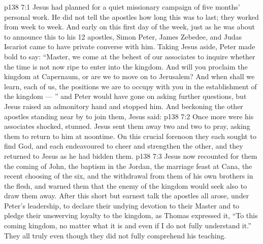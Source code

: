 \vs p138 7:1 Jesus had planned for a quiet missionary campaign of five months’ personal work. He did not tell the apostles how long this was to last; they worked from week to week. And early on this first day of the week, just as he was about to announce this to his 12 apostles, Simon Peter, James Zebedee, and Judas Iscariot came to have private converse with him. Taking Jesus aside, Peter made bold to say: “Master, we come at the behest of our associates to inquire whether the time is not now ripe to enter into the kingdom. And will you proclaim the kingdom at Capernaum, or are we to move on to Jerusalem? And when shall we learn, each of us, the positions we are to occupy with you in the establishment of the kingdom --- ” and Peter would have gone on asking further questions, but Jesus raised an admonitory hand and stopped him. And beckoning the other apostles standing near by to join them, Jesus said: 
\vs p138 7:2 Once more were his associates shocked, stunned. Jesus sent them away two and two to pray, asking them to return to him at noontime. On this crucial forenoon they each sought to find God, and each endeavoured to cheer and strengthen the other, and they returned to Jesus as he had bidden them.
\vs p138 7:3 Jesus now recounted for them the coming of John, the baptism in the Jordan, the marriage feast at Cana, the recent choosing of the six, and the withdrawal from them of his own brothers in the flesh, and warned them that the enemy of the kingdom would seek also to draw them away. After this short but earnest talk the apostles all arose, under Peter’s leadership, to declare their undying devotion to their Master and to pledge their unswerving loyalty to the kingdom, as Thomas expressed it, “To this coming kingdom, no matter what it is and even if I do not fully understand it.” They all truly  even though they did not fully comprehend his teaching.
